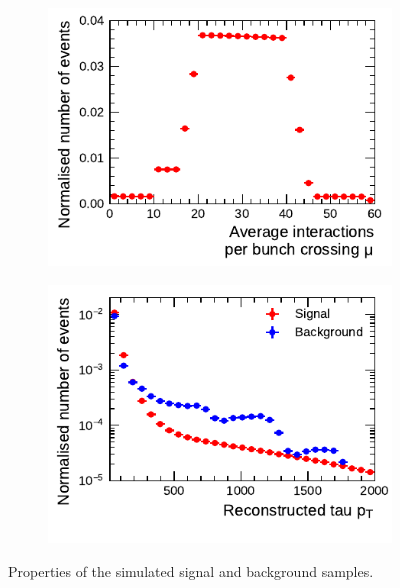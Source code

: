 \begin{figure}[htb]
  \centering
  \begin{subfigure}[t]{0.48\textwidth}
    \centering
    \includegraphics{./figures/bdt_perf/pt_mu_samples/mu.pdf}
  \end{subfigure}\hfill
  \begin{subfigure}[t]{0.48\textwidth}
    \centering
    \includegraphics{./figures/bdt_perf/pt_mu_samples/pt.pdf}
  \end{subfigure}
  \caption{Properties of the simulated signal and background samples.}
  \label{fig:pt_mu}
\end{figure}



